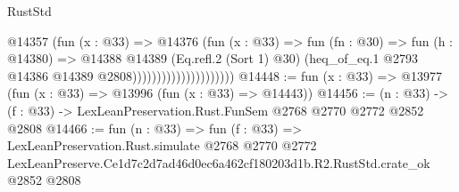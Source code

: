\begin{lexlean}{RustStd}
\begin{coremodule}
                                      @14357
                                        (fun (x : @33) =>
                                        @14376
                                          (fun (x : @33) =>
                                          fun (fn : @30) =>
                                          fun (h : @14380) =>
                                          @14388
                                            @14389
                                            (Eq.refl.{2} (Sort 1) @30)
                                            (heq_of_eq.{1}
                                              @2793
                                              @14386
                                              @14389
                                              @2808)))))))))))))))))))))
@14448 := fun (x : @33) => @13977 (fun (x : @33) => @13996 (fun (x : @33) => @14443))
@14456 := (n : @33) -> (f : @33) -> LexLeanPreservation.Rust.FunSem @2768 @2770 @2772 @2852 @2808
@14466 := fun (n : @33) =>
  fun (f : @33) =>
  LexLeanPreservation.Rust.simulate
    @2768
    @2770
    @2772
    LexLeanPreserve.Ce1d7c2d7ad46d0ec6a462cf180203d1b.R2.RustStd.crate_ok
    @2852
    @2808
\end{coremodule}
\end{lexlean}
